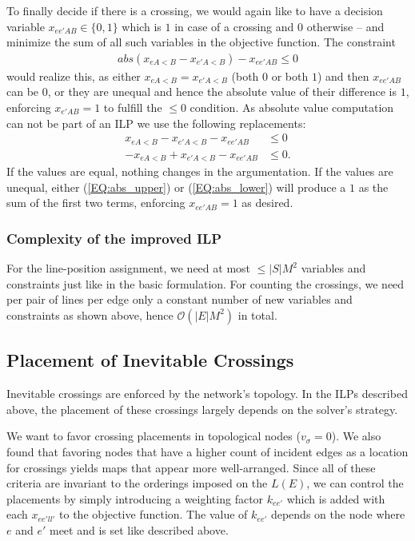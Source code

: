 \documentclass{llncs}
\begin{document}
To finally decide if there is a crossing, we would again like to have a decision variable $x_{ee'AB} \in \{0,1\}$ which is $1$ in case of a crossing and $0$ otherwise -- and minimize the sum of all such variables in the objective function.
The constraint
\begin{gather}
	abs(x_{eA<B}-x_{e'A<B}) - x_{ee'AB} \leq 0
\end{gather}
would realize this, as either $x_{eA<B} = x_{e'A<B}$ (both $0$ or both $1$) and then $x_{ee'AB}$ can be $0$, or they are unequal and hence the absolute value of their difference is $1$, enforcing $x_{e'AB}=1$ to fulfill the $\leq 0$ condition. As absolute value computation can not be part of an ILP we use the following replacements:
\begin{align}
	x_{eA<B} - x_{e'A<B} - x_{ee'AB} &\leq 0 \label{EQ:abs_upper}\\
	-x_{eA<B} + x_{e'A<B} - x_{ee'AB} &\leq 0. \label{EQ:abs_lower}
\end{align}
If the values are equal, nothing changes in the argumentation. If the values are unequal, either (\ref{EQ:abs_upper}) or (\ref{EQ:abs_lower})  will produce a $1$ as the sum of the first two terms, enforcing $x_{ee'AB}=1$ as desired.

\subsubsection{Complexity of the improved ILP}
For the line-position assignment, we need at most $\leq |S|M^{2}$ variables and constraints just like in the basic formulation. For counting the  crossings, we need per pair of lines per edge only a constant number of new variables and constraints as shown above, hence $\mathcal{O}(|E|M^{2})$ in total.

\subsection{Placement of Inevitable Crossings}\label{SEC:crossing_placement}

Inevitable crossings are enforced by the network's topology. In the ILPs described above, the placement of these crossings largely depends on the solver's strategy.

We want to favor crossing placements in topological nodes ($v_\sigma = 0$). We also found that favoring nodes that have a higher count of incident edges as a location for crossings yields maps that appear more well-arranged.
Since all of these criteria are invariant to the orderings imposed on the $L(E)$, we can control the placements by simply introducing a weighting factor $k_{ee'}$ which is added with each $x_{ee'll'}$ to the objective function.
The value of $k_{ee'}$ depends on the node where $e$ and $e'$ meet and is set like described above.
\end{document}

